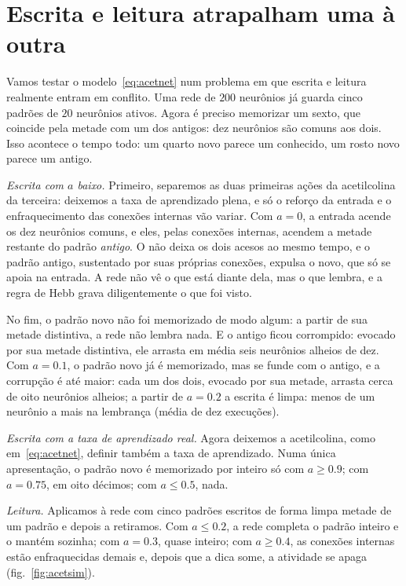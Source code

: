 \section{Escrita e leitura atrapalham uma à outra}

Vamos testar o modelo~\eqref{eq:acetnet} num problema em que escrita e leitura realmente entram em conflito. Uma rede de $200$ neurônios já guarda cinco padrões de $20$ neurônios ativos. Agora é preciso memorizar um sexto, que coincide pela metade com um dos antigos: dez neurônios são comuns aos dois. Isso acontece o tempo todo: um quarto novo parece um conhecido, um rosto novo parece um antigo.

\emph{Escrita com $a$ baixo.} Primeiro, separemos as duas primeiras ações da acetilcolina da terceira: deixemos a taxa de aprendizado plena, e só o reforço da entrada e o enfraquecimento das conexões internas vão variar. Com $a=0$, a entrada acende os dez neurônios comuns, e eles, pelas conexões internas, acendem a metade restante do padrão \emph{antigo}. O  não deixa os dois acesos ao mesmo tempo, e o padrão antigo, sustentado por suas próprias conexões, expulsa o novo, que só se apoia na entrada. A rede não vê o que está diante dela, mas o que lembra, e a regra de Hebb grava diligentemente o que foi visto.

No fim, o padrão novo não foi memorizado de modo algum: a partir de sua metade distintiva, a rede não lembra nada. E o antigo ficou corrompido: evocado por sua metade distintiva, ele arrasta em média seis neurônios alheios de dez. Com $a=0.1$, o padrão novo já é memorizado, mas se funde com o antigo, e a corrupção é até maior: cada um dos dois, evocado por sua metade, arrasta cerca de oito neurônios alheios; a partir de $a=0.2$ a escrita é limpa: menos de um neurônio a mais na lembrança (média de dez execuções).

\emph{Escrita com a taxa de aprendizado real.} Agora deixemos a acetilcolina, como em~\eqref{eq:acetnet}, definir também a taxa de aprendizado. Numa única apresentação, o padrão novo é memorizado por inteiro só com $a\ge0.9$; com $a=0.75$, em oito décimos; com $a\le0.5$, nada.

\emph{Leitura.} Aplicamos à rede com cinco padrões escritos de forma limpa metade de um padrão e depois a retiramos. Com $a\le0.2$, a rede completa o padrão inteiro e o mantém sozinha; com $a=0.3$, quase inteiro; com $a\ge0.4$, as conexões internas estão enfraquecidas demais e, depois que a dica some, a atividade se apaga (fig.~\ref{fig:acetsim}).

